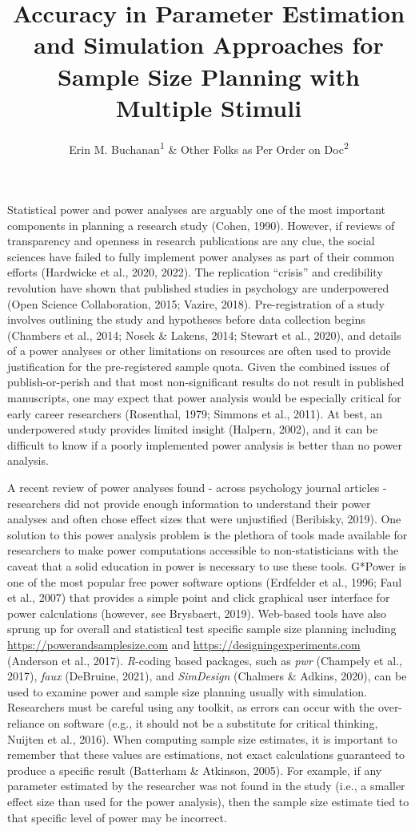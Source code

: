 \documentclass[
  man]{apa7}
\title{Accuracy in Parameter Estimation and Simulation Approaches for Sample Size Planning with Multiple Stimuli}
\author{Erin M. Buchanan\textsuperscript{1} \& Other Folks as Per Order on Doc\textsuperscript{2}}
\date{}
\affiliation{\vspace{0.5cm}\textsuperscript{1} Harrisburg University of Science and Technology\\\textsuperscript{2} Other Instituions}
\begin{document}
\maketitle

Statistical power and power analyses are arguably one of the most important components in planning a research study (Cohen, 1990). However, if reviews of transparency and openness in research publications are any clue, the social sciences have failed to fully implement power analyses as part of their common efforts (Hardwicke et al., 2020, 2022). The replication ``crisis'' and credibility revolution have shown that published studies in psychology are underpowered (Open Science Collaboration, 2015; Vazire, 2018). Pre-registration of a study involves outlining the study and hypotheses before data collection begins (Chambers et al., 2014; Nosek \& Lakens, 2014; Stewart et al., 2020), and details of a power analyses or other limitations on resources are often used to provide justification for the pre-registered sample quota. Given the combined issues of publish-or-perish and that most non-significant results do not result in published manuscripts, one may expect that power analysis would be especially critical for early career researchers (Rosenthal, 1979; Simmons et al., 2011). At best, an underpowered study provides limited insight (Halpern, 2002), and it can be difficult to know if a poorly implemented power analysis is better than no power analysis.

A recent review of power analyses found - across psychology journal articles - researchers did not provide enough information to understand their power analyses and often chose effect sizes that were unjustified (Beribisky, 2019). One solution to this power analysis problem is the plethora of tools made available for researchers to make power computations accessible to non-statisticians with the caveat that a solid education in power is necessary to use these tools. G*Power is one of the most popular free power software options (Erdfelder et al., 1996; Faul et al., 2007) that provides a simple point and click graphical user interface for power calculations (however, see Brysbaert, 2019). Web-based tools have also sprung up for overall and statistical test specific sample size planning including \url{https://powerandsamplesize.com} and \url{https://designingexperiments.com} (Anderson et al., 2017). \emph{R}-coding based packages, such as \emph{pwr} (Champely et al., 2017), \emph{faux} (DeBruine, 2021), and \emph{SimDesign} (Chalmers \& Adkins, 2020), can be used to examine power and sample size planning usually with simulation. Researchers must be careful using any toolkit, as errors can occur with the over-reliance on software (e.g., it should not be a substitute for critical thinking, Nuijten et al., 2016). When computing sample size estimates, it is important to remember that these values are estimations, not exact calculations guaranteed to produce a specific result (Batterham \& Atkinson, 2005). For example, if any parameter estimated by the researcher was not found in the study (i.e., a smaller effect size than used for the power analysis), then the sample size estimate tied to that specific level of power may be incorrect.
\end{document}
